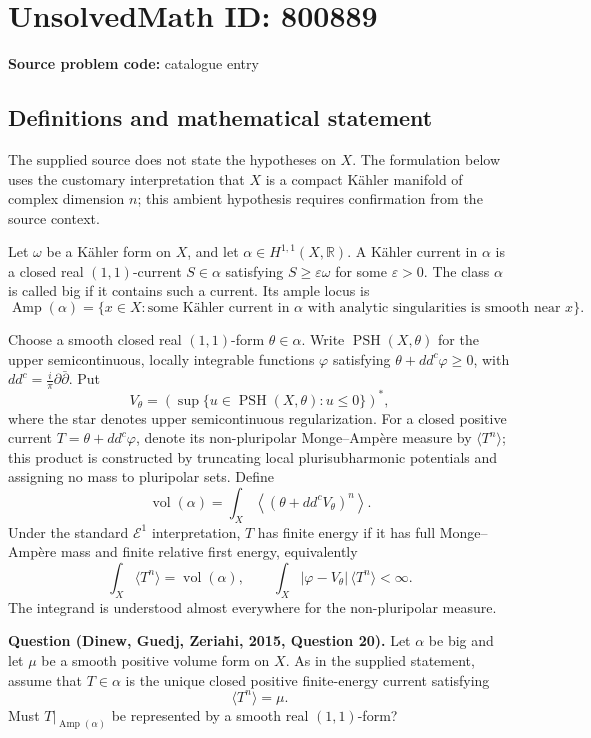 \documentclass[11pt]{article}
\newcommand{\R}{\mathbb{R}}
\begin{document}
\section*{UnsolvedMath ID: 800889}
\textbf{Source problem code:} catalogue entry
\subsection{Definitions and mathematical statement}
The supplied source does not state the hypotheses on \(X\). The formulation below uses the customary interpretation that \(X\) is a compact K\"ahler manifold of complex dimension \(n\); this ambient hypothesis requires confirmation from the source context.

Let \(\omega\) be a K\"ahler form on \(X\), and let \(\alpha\in H^{1,1}(X,\R)\). A K\"ahler current in \(\alpha\) is a closed real \((1,1)\)-current \(S\in\alpha\) satisfying \(S\geq\varepsilon\omega\) for some \(\varepsilon>0\). The class \(\alpha\) is called big if it contains such a current. Its ample locus is
\[
\operatorname{Amp}(\alpha)=\{x\in X:\text{some K\"ahler current in }\alpha\text{ with analytic singularities is smooth near }x\}.
\]

Choose a smooth closed real \((1,1)\)-form \(\theta\in\alpha\). Write \(\operatorname{PSH}(X,\theta)\) for the upper semicontinuous, locally integrable functions \(\varphi\) satisfying \(\theta+dd^c\varphi\geq0\), with \(dd^c=\frac{i}{\pi}\partial\bar\partial\). Put
\[
V_\theta=\left(\sup\{u\in\operatorname{PSH}(X,\theta):u\leq0\}\right)^* ,
\]
where the star denotes upper semicontinuous regularization. For a closed positive current \(T=\theta+dd^c\varphi\), denote its non-pluripolar Monge--Amp\`ere measure by \(\langle T^n\rangle\); this product is constructed by truncating local plurisubharmonic potentials and assigning no mass to pluripolar sets. Define
\[
\operatorname{vol}(\alpha)=\int_X\left\langle(\theta+dd^cV_\theta)^n\right\rangle.
\]
Under the standard \(\mathcal E^1\) interpretation, \(T\) has finite energy if it has full Monge--Amp\`ere mass and finite relative first energy, equivalently
\[
\int_X\langle T^n\rangle=\operatorname{vol}(\alpha),
\qquad
\int_X|\varphi-V_\theta|\,\langle T^n\rangle<\infty.
\]
The integrand is understood almost everywhere for the non-pluripolar measure.

\textbf{Question (Dinew, Guedj, Zeriahi, 2015, Question 20).} Let \(\alpha\) be big and let \(\mu\) be a smooth positive volume form on \(X\). As in the supplied statement, assume that \(T\in\alpha\) is the unique closed positive finite-energy current satisfying
\[
\langle T^n\rangle=\mu.
\]
Must \(T|_{\operatorname{Amp}(\alpha)}\) be represented by a smooth real \((1,1)\)-form?
\end{document}
